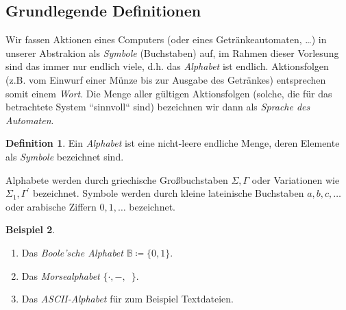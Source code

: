 \documentclass[11pt, a4paper]{article}
\theoremstyle{definition}
\newtheorem{definition}{Definition}[section]
\newtheorem{example}[definition]{Beispiel}
\theoremstyle{plain}
\numberwithin{equation}{section}
\begin{document}
\subsection{Grundlegende Definitionen}\label{sec:awl_def}
Wir fassen Aktionen eines Computers (oder eines Getränkeautomaten, \ldots) in unserer Abstrakion als \textit{Symbole} (Buchstaben) auf, im Rahmen dieser Vorlesung sind das immer nur endlich viele, d.h. das \textit{Alphabet} ist endlich. Aktionsfolgen (z.B. vom Einwurf einer Münze bis zur Ausgabe des Getränkes) entsprechen somit einem \textit{Wort}. Die Menge aller gültigen Aktionsfolgen (solche, die für das betrachtete System ``sinnvoll`` sind) bezeichnen wir dann als \textit{Sprache des Automaten}.
\begin{definition}
	Ein \textit{Alphabet} ist eine nicht-leere endliche Menge, deren Elemente als \textit{Symbole} bezeichnet sind.
\end{definition}
Alphabete werden durch griechische Großbuchstaben $\Sigma, \Gamma$ oder Variationen wie $\Sigma_1, \Gamma^\prime$ bezeichnet. Symbole werden durch kleine lateinische Buchstaben $a, b, c, \ldots$ oder arabische Ziffern $0, 1, \ldots$ bezeichnet.
\begin{example}
	\
	\begin{enumerate}
		\item Das \textit{Boole'sche Alphabet} $\mathbb{B} \coloneqq \{ 0, 1 \}$.
		\item Das \textit{Morsealphabet} $\{ \cdot, -, \,\,\, \}$.
		\item Das \textit{ASCII-Alphabet} für zum Beispiel Textdateien.
	\end{enumerate}
\end{example}
\end{document}
